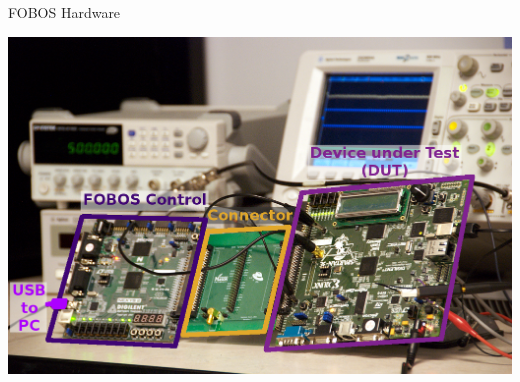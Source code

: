 \documentclass[xcolor=pdftex,dvipsnames,table,final]{beamer}
\begin{document}
\begin{frame}[fragile]{}
\begin{columns}[t]
\begin{column}{.31\linewidth}
      \begin{block}{FOBOS Hardware}
        \vspace{-1ex}
        \begin{center}
          \includegraphics[width=0.9\linewidth]{../figures/FOBOS-label}
        \end{center} 
        \vspace{-1ex}
       \end{block}
     

\end{column}
\end{columns}
\end{frame}
\end{document}
